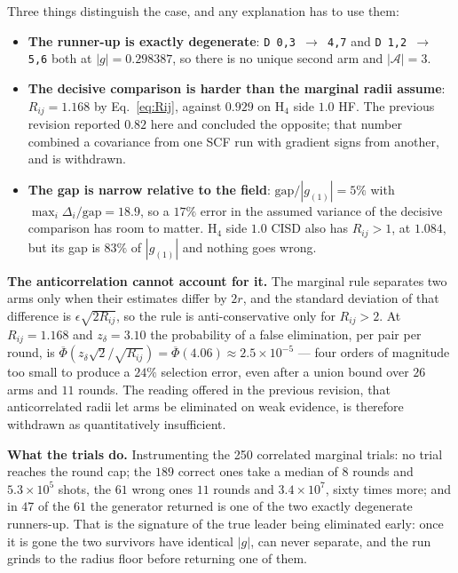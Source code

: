 \documentclass[10pt]{article}
\begin{document}
Three things distinguish the case, and any explanation has to use them:

\begin{itemize}[leftmargin=2em,itemsep=1pt]
  \item \textbf{The runner-up is exactly degenerate}: \texttt{D 0,3 $\to$ 4,7} and \texttt{D 1,2 $\to$ 5,6} both at $|g|=0.298387$, so there is no unique second arm and $|\mathcal A|=3$.
  \item \textbf{The decisive comparison is harder than the marginal radii assume}: $R_{ij}=1.168$ by Eq.~\eqref{eq:Rij}, against $0.929$ on H$_4$ side $1.0$ HF. The previous revision reported $0.82$ here and concluded the opposite; that number combined a covariance from one SCF run with gradient signs from another, and is withdrawn.
  \item \textbf{The gap is narrow relative to the field}: $\mathrm{gap}/|g_{(1)}|=5\%$ with $\max_i\Delta_i/\mathrm{gap}=18.9$, so a $17\%$ error in the assumed variance of the decisive comparison has room to matter. H$_4$ side $1.0$ CISD also has $R_{ij}>1$, at $1.084$, but its gap is $83\%$ of $|g_{(1)}|$ and nothing goes wrong.
\end{itemize}

\textbf{The anticorrelation cannot account for it.} The marginal rule separates
two arms only when their estimates differ by $2r$, and the standard deviation of
that difference is $\epsilon\sqrt{2R_{ij}}$, so the rule is anti-conservative
only for $R_{ij}>2$. At $R_{ij}=1.168$ and $z_\delta=3.10$ the probability of a
false elimination, per pair per round, is
$\overline\Phi\!\left(z_\delta\sqrt2/\sqrt{R_{ij}}\right)=\overline\Phi(4.06)
\approx2.5\times10^{-5}$ --- four orders of magnitude too small to produce a
$24\%$ selection error, even after a union bound over $26$ arms and $11$ rounds.
The reading offered in the previous revision, that anticorrelated radii let arms
be eliminated on weak evidence, is therefore withdrawn as quantitatively
insufficient.

\textbf{What the trials do.} Instrumenting the 250 correlated marginal trials: no
trial reaches the round cap; the $189$ correct ones take a median of $8$ rounds
and $5.3\times10^{5}$ shots, the $61$ wrong ones $11$ rounds and
$3.4\times10^{7}$, sixty times more; and in $47$ of the $61$ the generator
returned is one of the two exactly degenerate runners-up. That is the signature
of the true leader being eliminated early: once it is gone the two survivors have
identical $|g|$, can never separate, and the run grinds to the radius floor
before returning one of them.
\end{document}

